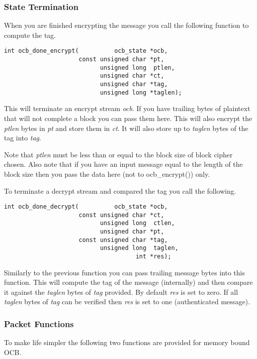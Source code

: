 \documentclass[synpaper]{book}
\begin{document}
\subsubsection{State Termination}

When you are finished encrypting the message you call the following function to compute the tag.

\begin{verbatim}
int ocb_done_encrypt(          ocb_state *ocb, 
                     const unsigned char *pt, 
                           unsigned long  ptlen,
                           unsigned char *ct, 
                           unsigned char *tag, 
                           unsigned long *taglen);
\end{verbatim}

This will terminate an encrypt stream \textit{ocb}.  If you have trailing bytes of plaintext that will not complete a block 
you can pass them here.  This will also encrypt the \textit{ptlen} bytes in \textit{pt} and store them in \textit{ct}.  It will also
store up to \textit{taglen} bytes of the tag into \textit{tag}.

Note that \textit{ptlen} must be less than or equal to the block size of block cipher chosen.  Also note that if you have 
an input message equal to the length of the block size then you pass the data here (not to ocb\_encrypt()) only.  

To terminate a decrypt stream and compared the tag you call the following.

\begin{verbatim}
int ocb_done_decrypt(          ocb_state *ocb, 
                     const unsigned char *ct,  
                           unsigned long  ctlen,
                           unsigned char *pt, 
                     const unsigned char *tag, 
                           unsigned long  taglen, 
                                     int *res);
\end{verbatim}
Similarly to the previous function you can pass trailing message bytes into this function.  This will compute the 
tag of the message (internally) and then compare it against the \textit{taglen} bytes of \textit{tag} provided.  By default
\textit{res} is set to zero.  If all \textit{taglen} bytes of \textit{tag} can be verified then \textit{res} is set to one (authenticated
message).

\subsubsection{Packet Functions}
To make life simpler the following two functions are provided for memory bound OCB.
\end{document}
